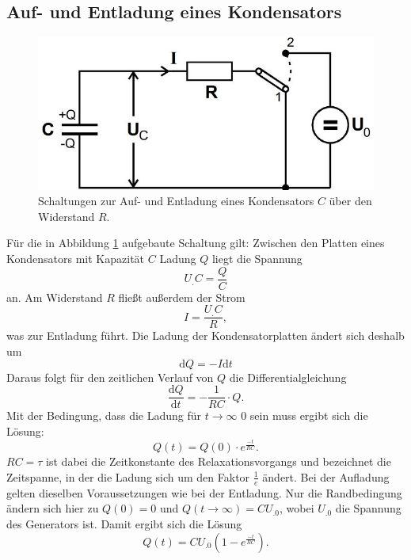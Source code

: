 \subsection{Auf- und Entladung eines Kondensators}
\label{sec:Entladung}
\begin{figure}
\centering
\includegraphics[scale=0.35]{content/images/theorie.jpg}
\caption{Schaltungen zur Auf- und Entladung eines Kondensators $C$ über den Widerstand $R$.\cite{V353}}
\label{fig:theorie}
\end{figure}
Für die in Abbildung \ref{fig:theorie} aufgebaute Schaltung gilt:
Zwischen den Platten eines Kondensators mit Kapazität $C$ Ladung $Q$  liegt die Spannung
\begin{equation}
U_.C=\frac{Q}{C}\label{eq:QC}
\end{equation}
an. Am Widerstand $R$ fließt außerdem der Strom
\begin{equation}
I = \frac{U_.C}{R},
\end{equation}
was zur Entladung führt.
Die Ladung der Kondensatorplatten ändert sich deshalb um
\begin{equation}
\mathrm{d}Q = - I\mathrm{d}t\label{eq:dQ}
\end{equation}
Daraus folgt für den zeitlichen Verlauf von $Q$ die Differentialgleichung
\begin{equation}
\frac{\mathrm{d}Q}{\mathrm{d}t} = - \frac{1}{RC}\cdot Q\text{.}
\label{eq:DGL}
\end{equation}
Mit der Bedingung, dass die Ladung für $t\rightarrow\infty$ 0 sein muss ergibt sich die Lösung:
\begin{equation}
Q(t) = Q(0)\cdot e^{\frac{-t}{RC}} \text{.}\label{eq:Q1}
\end{equation}
$RC=\tau$ ist dabei die Zeitkonstante des Relaxationsvorgangs und bezeichnet die Zeitspanne, in der die Ladung sich um den Faktor $\frac{1}{e}$ ändert.\newline
Bei der Aufladung gelten dieselben Voraussetzungen wie bei der Entladung. Nur die Randbedingung ändern sich hier zu $Q(0)=0$ und $Q(t\rightarrow\infty)=CU_.0$, wobei $U_.0$ die Spannung des Generators ist.
Damit ergibt sich die Lösung
\begin{equation}
Q(t) = CU_.0\left(1-e^{\frac{-t}{RC}}\right) \text{.}\label{eq:Q2}
\end{equation}
